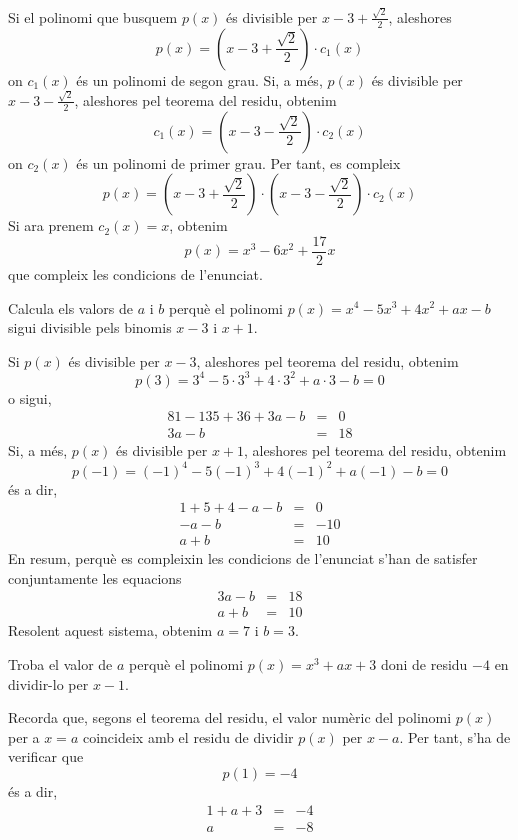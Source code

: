\begin{solucio}
Si el polinomi que busquem $p(x)$ és divisible per $x-3+\frac{\sqrt{2}}{2}$, aleshores\[
p(x)=\left( x-3+\frac{\sqrt{2}}{2}\right) \cdot c_{1}(x)
\]on $c_{1}(x)$ és un polinomi de segon grau. Si, a més, $p(x)$ és
divisible per $x-3-\frac{\sqrt{2}}{2}$, aleshores pel teorema del residu,
obtenim\[
c_{1}(x)=\left( x-3-\frac{\sqrt{2}}{2}\right) \cdot c_{2}(x)
\]on $c_{2}(x)$ és un polinomi de primer grau. Per tant, es compleix\[
p(x)=\left( x-3+\frac{\sqrt{2}}{2}\right) \cdot \left( x-3-\frac{\sqrt{2}}{2}\right) \cdot c_{2}(x)
\]Si ara prenem $c_{2}(x)=x$, obtenim\[
p(x)=x^{3}-6x^{2}+\frac{17}{2}x
\]que compleix les condicions de l'enunciat.
\end{solucio}

\begin{exercici}
Calcula els valors de $a$ i $b$ perquè el polinomi $p(x)=x^{4}-5x^{3}+4x^{2}+ax-b$ sigui divisible pels binomis $x-3$ i $x+1$.
\end{exercici}

\begin{solucio}
Si $p(x)$ és divisible per $x-3$, aleshores pel teorema del residu,
obtenim\[
p(3)=3^{4}-5\cdot 3^{3}+4\cdot 3^{2}+a\cdot 3-b=0
\]o sigui,\begin{eqnarray*}
81-135+36+3a-b &=&0 \\
3a-b &=&18
\end{eqnarray*}Si, a més, $p(x)$ és divisible per $x+1$, aleshores pel teorema del
residu, obtenim\[
p(-1)=\left( -1\right) ^{4}-5\left( -1\right) ^{3}+4\left( -1\right)
^{2}+a\left( -1\right) -b=0
\]és a dir,\begin{eqnarray*}
1+5+4-a-b &=&0 \\
-a-b &=&-10 \\
a+b &=&10
\end{eqnarray*}En resum, perquè es compleixin les condicions de l'enunciat s'han de
satisfer conjuntamente les equacions\begin{eqnarray*}
3a-b &=&18 \\
a+b &=&10
\end{eqnarray*}Resolent aquest sistema, obtenim $a=7$ i $b=3$.
\end{solucio}

\begin{exercici}
Troba el valor de $a$ perquè el polinomi $p(x)=x^{3}+ax+3$ doni de
residu $-4$ en dividir-lo per $x-1$.
\end{exercici}

\begin{solucio}
Recorda que, segons el teorema del residu, el valor numèric del
polinomi $p(x)$ per a $x=a$ coincideix amb el residu de dividir $p(x)$ per $x-a$. Per tant, s'ha de verificar que\[
p(1)=-4
\]és a dir,\begin{eqnarray*}
1+a+3 &=&-4 \\
a &=&-8
\end{eqnarray*}
\end{solucio}

